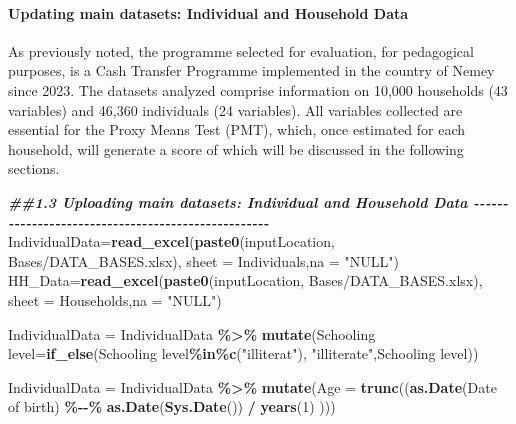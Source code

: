 \documentclass[
]{article}
\newenvironment{Shaded}{\begin{snugshade}}{\end{snugshade}}
\newcommand{\AttributeTok}[1]{\textcolor[rgb]{0.13,0.29,0.53}{#1}}
\newcommand{\DecValTok}[1]{\textcolor[rgb]{0.00,0.00,0.81}{#1}}
\newcommand{\DocumentationTok}[1]{\textcolor[rgb]{0.56,0.35,0.01}{\textbf{\textit{#1}}}}
\newcommand{\FunctionTok}[1]{\textcolor[rgb]{0.13,0.29,0.53}{\textbf{#1}}}
\newcommand{\NormalTok}[1]{#1}
\newcommand{\OtherTok}[1]{\textcolor[rgb]{0.56,0.35,0.01}{#1}}
\newcommand{\SpecialCharTok}[1]{\textcolor[rgb]{0.81,0.36,0.00}{\textbf{#1}}}
\newcommand{\StringTok}[1]{\textcolor[rgb]{0.31,0.60,0.02}{#1}}
\begin{document}
\paragraph{\texorpdfstring{\textbf{Updating main datasets: Individual
and Household
Data}}{Updating main datasets: Individual and Household Data}}\label{updating-main-datasets-individual-and-household-data}

As previously noted, the programme selected for evaluation, for
pedagogical purposes, is a Cash Transfer Programme implemented in the
country of Nemey since 2023. The datasets analyzed comprise information
on 10,000 households (43 variables) and 46,360 individuals (24
variables). All variables collected are essential for the Proxy Means
Test (PMT), which, once estimated for each household, will generate a
score of which will be discussed in the following sections.

\begin{Shaded}
\begin{Highlighting}[]
\DocumentationTok{\#\#1.3 Uploading main datasets: Individual and Household Data  {-}{-}{-}{-}{-}{-}{-}{-}{-}{-}{-}{-}{-}{-}{-}{-}{-}{-}{-}{-}{-}{-}{-}{-}{-}{-}{-}{-}{-}{-}{-}{-}{-}{-}{-}{-}{-}{-}{-}{-}{-}{-}{-}{-}{-}{-}{-}{-}{-}{-}{-}}
\NormalTok{IndividualData}\OtherTok{=}\FunctionTok{read\_excel}\NormalTok{(}\FunctionTok{paste0}\NormalTok{(inputLocation, }\StringTok{\textquotesingle{}Bases/DATA\_BASES.xlsx\textquotesingle{}}\NormalTok{), }\AttributeTok{sheet =} \StringTok{\textquotesingle{}Individuals\textquotesingle{}}\NormalTok{,}\AttributeTok{na =} \StringTok{"NULL"}\NormalTok{)}
\NormalTok{HH\_Data}\OtherTok{=}\FunctionTok{read\_excel}\NormalTok{(}\FunctionTok{paste0}\NormalTok{(inputLocation, }\StringTok{\textquotesingle{}Bases/DATA\_BASES.xlsx\textquotesingle{}}\NormalTok{), }\AttributeTok{sheet =} \StringTok{\textquotesingle{}Households\textquotesingle{}}\NormalTok{,}\AttributeTok{na =} \StringTok{"NULL"}\NormalTok{)}

\NormalTok{IndividualData }\OtherTok{=}\NormalTok{ IndividualData }\SpecialCharTok{\%\textgreater{}\%} 
  \FunctionTok{mutate}\NormalTok{(}\StringTok{\textasciigrave{}}\AttributeTok{Schooling level}\StringTok{\textasciigrave{}}\OtherTok{=}\FunctionTok{if\_else}\NormalTok{(}\StringTok{\textasciigrave{}}\AttributeTok{Schooling level}\StringTok{\textasciigrave{}}\SpecialCharTok{\%in\%}\FunctionTok{c}\NormalTok{(}\StringTok{"illiterat"}\NormalTok{), }\StringTok{"illiterate"}\NormalTok{,}\StringTok{\textasciigrave{}}\AttributeTok{Schooling level}\StringTok{\textasciigrave{}}\NormalTok{))}

\NormalTok{IndividualData }\OtherTok{=}\NormalTok{ IndividualData }\SpecialCharTok{\%\textgreater{}\%}
  \FunctionTok{mutate}\NormalTok{(}\AttributeTok{Age =} \FunctionTok{trunc}\NormalTok{((}\FunctionTok{as.Date}\NormalTok{(}\StringTok{\textasciigrave{}}\AttributeTok{Date of birth}\StringTok{\textasciigrave{}}\NormalTok{) }\SpecialCharTok{\%{-}{-}\%} \FunctionTok{as.Date}\NormalTok{(}\FunctionTok{Sys.Date}\NormalTok{()) }\SpecialCharTok{/} \FunctionTok{years}\NormalTok{(}\DecValTok{1}\NormalTok{) )))}
\end{Highlighting}
\end{Shaded}
\end{document}
